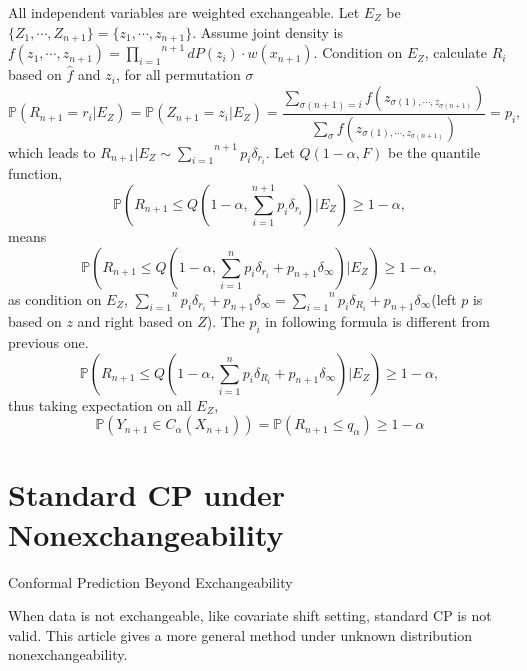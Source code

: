 \documentclass[12pt, a4paper, oneside]{article}
\begin{document}
    All independent variables are weighted exchangeable. Let $E_Z$ be $\{Z_1,\cdots,Z_{n+1}\}=\{z_1,\cdots,z_{n+1}\}$. Assume joint density is $f(z_1,\cdots,z_{n+1})=\overset{n+1}{\underset{i=1}{\prod}}dP(z_i)\cdot w(x_{n+1})$. Condition on $E_Z$, calculate $R_i$ based on $\hat{f}$ and $z_i$, for all permutation $\sigma$
    \begin{equation*}
        \mathbb{P}\left( R_{n+1}=r_i\Big| E_Z \right)=\mathbb{P}\left( Z_{n+1}=z_i\Big| E_Z \right)=\dfrac{\underset{\sigma(n+1)=i}{\sum}f(z_{\sigma(1),\cdots,z_{\sigma(n+1)}})}{\underset{\sigma}{\sum}f(z_{\sigma(1),\cdots,z_{\sigma(n+1)}})}=p_i, 
    \end{equation*}
    which leads to $R_{n+1}\Big| E_Z\sim \overset{n+1}{\underset{i=1}\sum}p_i\delta_{r_i}$. Let $Q(1-\alpha,F)$ be the quantile function,
    \begin{equation*}
        \mathbb{P}\left( R_{n+1}\leq Q(1-\alpha,\overset{n+1}{\underset{i=1}\sum}p_i\delta_{r_i})\Big| E_Z \right)\geq 1-\alpha,
    \end{equation*}
    means
    \begin{equation*}
        \mathbb{P}\left( R_{n+1}\leq Q(1-\alpha,\overset{n}{\underset{i=1}\sum}p_i\delta_{r_i}+p_{n+1}\delta_{\infty})\Big| E_Z \right)\geq 1-\alpha,
    \end{equation*}
    as condition on $E_Z$, $\overset{n}{\underset{i=1}\sum}p_i\delta_{r_i}+p_{n+1}\delta_{\infty}=\overset{n}{\underset{i=1}\sum}p_i\delta_{R_i}+p_{n+1}\delta_{\infty}$(left $p$ is based on $z$ and right based on $Z$). The $p_i$ in following formula is different from previous one.
    \begin{equation*}
        \mathbb{P}\left( R_{n+1}\leq Q(1-\alpha,\overset{n}{\underset{i=1}\sum}p_i\delta_{R_i}+p_{n+1}\delta_{\infty})\Big| E_Z \right)\geq 1-\alpha,
    \end{equation*}
    thus taking expectation on all $E_Z$,
    \begin{equation*}
        \mathbb{P}\left( Y_{n+1}\in C_\alpha(X_{n+1}) \right)=\mathbb{P}\left( R_{n+1}\leq q_\alpha \right)\geq 1-\alpha
    \end{equation*}


\section{Standard CP under Nonexchangeability}
    Conformal Prediction Beyond Exchangeability\cite{barber2023conformal}


    When data is not exchangeable, like covariate shift setting, standard CP is not valid. This article gives a more general method under unknown distribution nonexchangeability.
\end{document}
